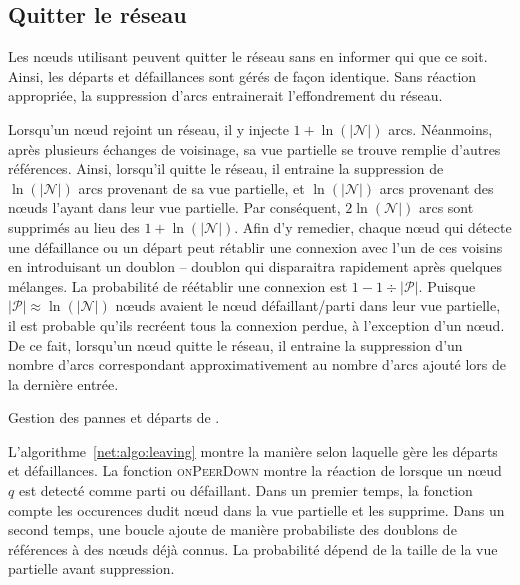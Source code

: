 \subsection{Quitter le réseau}
\label{net:subsec:leaving}

Les nœuds utilisant \SPRAY peuvent quitter le réseau sans en informer qui que ce
soit. Ainsi, les départs et défaillances sont gérés de façon identique. Sans
réaction appropriée, la suppression d'arcs entrainerait l'effondrement du
réseau.

Lorsqu'un nœud rejoint un réseau, il y injecte $1+\ln(|\mathcal{N}|)$
arcs. Néanmoins, après plusieurs échanges de voisinage, sa vue partielle se
trouve remplie d'autres références. Ainsi, lorsqu'il quitte le réseau, il
entraine la suppression de $\ln(|\mathcal{N}|)$ arcs provenant de sa vue
partielle, et $\ln(|\mathcal{N}|)$ arcs provenant des nœuds l'ayant dans leur
vue partielle. Par conséquent, $2\ln(\mathcal{N}|)$ arcs sont supprimés au lieu
des $1+\ln(|\mathcal{N}|)$. Afin d'y remedier, chaque nœud qui détecte une
défaillance ou un départ peut rétablir une connexion avec l'un de ces voisins en
introduisant un doublon -- doublon qui disparaitra rapidement après quelques
mélanges. La probabilité de réétablir une connexion est
$1-1\div{|\mathcal{P}|}$. Puisque ${|\mathcal{P}|}\approx \ln(|\mathcal{N}|)$
nœuds avaient le nœud défaillant/parti dans leur vue partielle, il est probable
qu'ils recréent tous la connexion perdue, à l'exception d'un nœud. De ce fait,
lorsqu'un nœud quitte le réseau, il entraine la suppression d'un nombre d'arcs
correspondant approximativement au nombre d'arcs ajouté lors de la dernière
entrée.

\begin{algorithm}[h]
  
  \caption[Gestion des pannes et départs de \SPRAY]
  {\label{net:algo:leaving}Gestion des pannes et départs de \SPRAY.}
\end{algorithm}

L'algorithme~\ref{net:algo:leaving} montre la manière selon laquelle \SPRAY gère
les départs et défaillances. La fonction \textsc{onPeerDown} montre la réaction
de \SPRAY lorsque un nœud $q$ est detecté comme parti ou défaillant. Dans un
premier temps, la fonction compte les occurences dudit nœud dans la vue
partielle et les supprime. Dans un second temps, une boucle ajoute de manière
probabiliste des doublons de références à des nœuds déjà connus. La probabilité
dépend de la taille de la vue partielle avant suppression.

